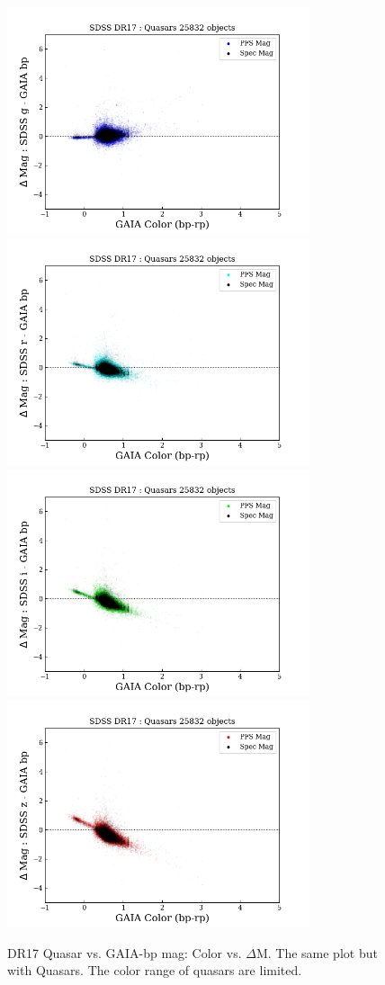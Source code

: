 \documentclass[apj,twocolumn]{aastex631}
\begin{document}
\begin{figure}%
\begin{center}
\includegraphics[angle=0,width=8.9cm]{figures/20220812_color_dmag_g_bp_dr17quasar.png}
\includegraphics[angle=0,width=8.9cm]{figures/20220812_color_dmag_r_bp_dr17quasar.png}
\includegraphics[angle=0,width=8.9cm]{figures/20220812_color_dmag_i_bp_dr17quasar.png}
\includegraphics[angle=0,width=8.9cm]{figures/20220812_color_dmag_z_bp_dr17quasar.png}
\caption{DR17 Quasar vs. GAIA-bp mag: Color vs. $\Delta$M.  The same plot but with Quasars.  The color range of quasars are limited.}
\end{center}
\end{figure}
\end{document}
